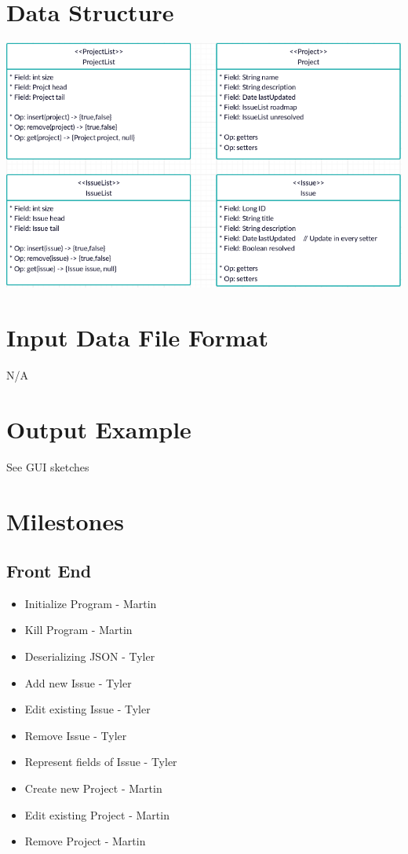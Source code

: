 \documentclass{article}
\begin{document}
\section{Data Structure}

    \includegraphics[scale=.6]{IssueTracker_UML.png}

\section{Input Data File Format}

    N/A

\section{Output Example}

    See GUI sketches

\section{Milestones}

    \subsection{Front End}

        \begin{itemize}
            \item Initialize Program                - Martin
            \item Kill Program                      - Martin
            \item Deserializing JSON                - Tyler
            \item Add new Issue                     - Tyler
            \item Edit existing Issue               - Tyler
            \item Remove Issue                      - Tyler
            \item Represent fields of Issue         - Tyler
            \item Create new Project                - Martin
            \item Edit existing Project             - Martin
            \item Remove Project                    - Martin
        \end{itemize}
\end{document}
